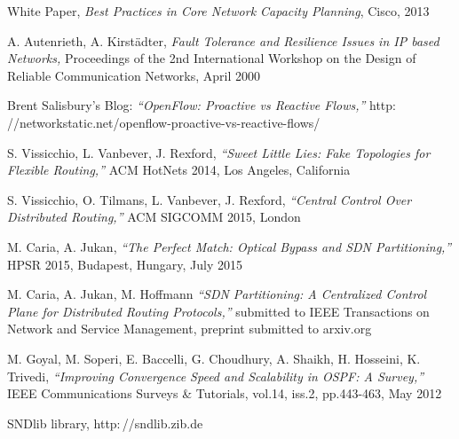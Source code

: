 \documentclass[10pt, conference]{IEEEtran}
\begin{document}
\begin{thebibliography}{1}
 White Paper, \emph{Best Practices in Core Network Capacity Planning}, Cisco, 2013

 A. Autenrieth, A. Kirst\"{a}dter, \emph{Fault Tolerance and Resilience Issues in IP based Networks,} Proceedings of the 2nd International Workshop on the Design of Reliable Communication Networks, April 2000

 Brent Salisbury's Blog: \emph{``OpenFlow: Proactive vs Reactive Flows,''} http$:$//networkstatic$.$net/openflow-proactive-vs-reactive-flows/

 S. Vissicchio, L. Vanbever, J. Rexford, \emph{``Sweet Little Lies: Fake Topologies for Flexible Routing,''} ACM HotNets 2014, Los Angeles, California

 S. Vissicchio, O. Tilmans, L. Vanbever, J. Rexford, \emph{``Central Control Over Distributed Routing,''} ACM SIGCOMM 2015, London

 M. Caria, A. Jukan, \emph{``The Perfect Match: Optical Bypass and SDN Partitioning,''} HPSR 2015, Budapest, Hungary, July 2015

 M. Caria, A. Jukan,  M. Hoffmann \emph{``SDN Partitioning: A Centralized Control Plane for Distributed Routing Protocols,''} submitted to IEEE Transactions on Network and Service Management, preprint submitted to arxiv.org

 M. Goyal, M. Soperi, E. Baccelli, G. Choudhury, A. Shaikh, H. Hosseini, K. Trivedi, \emph{``Improving Convergence Speed and Scalability in OSPF: A Survey,''} IEEE Communications Surveys \& Tutorials, vol.14, iss.2, pp.443-463, May 2012

 SNDlib library, http$:$//sndlib$.$zib$.$de

\end{thebibliography}
\end{document}
